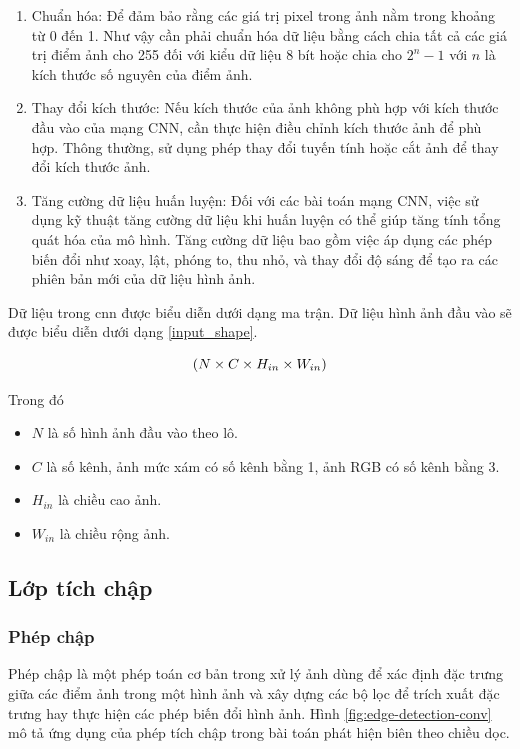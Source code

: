 \begin{enumerate}
	\item Chuẩn hóa: Để đảm bảo rằng các giá trị pixel trong ảnh nằm trong khoảng từ 0 đến 1. Như vậy cần phải chuẩn hóa dữ liệu bằng cách chia tất cả các giá trị điểm ảnh cho 255 đối với kiểu dữ liệu 8 bít hoặc chia cho $2^n-1$ với $n$ là kích thước số nguyên của điểm ảnh.
	\item Thay đổi kích thước: Nếu kích thước của ảnh không phù hợp với kích thước đầu vào của mạng CNN, cần thực hiện điều chỉnh kích thước ảnh để phù hợp. Thông thường, sử dụng phép thay đổi tuyến tính hoặc cắt ảnh để thay đổi kích thước ảnh.
	\item Tăng cường dữ liệu huấn luyện: Đối với các bài toán mạng CNN, việc sử dụng kỹ thuật tăng cường dữ liệu khi huấn luyện có thể giúp tăng tính tổng quát hóa của mô hình. Tăng cường dữ liệu bao gồm việc áp dụng các phép biến đổi như xoay, lật, phóng to, thu nhỏ, và thay đổi độ sáng để tạo ra các phiên bản mới của dữ liệu hình ảnh.
\end{enumerate}

Dữ liệu trong cnn được biểu diễn dưới dạng ma trận. Dữ liệu hình ảnh đầu vào sẽ được biểu diễn dưới dạng \ref{input_shape}.

\begin{equation}
	\centering
	\label{input_shape}
	(N \times C \times H_{in} \times W_{in})
\end{equation}

Trong đó
\begin{itemize}
	\item $N$ là số hình ảnh đầu vào theo lô.
	\item $C$ là số kênh, ảnh mức xám có số kênh bằng 1, ảnh RGB có số kênh bằng 3.
	\item $H_{in}$ là chiều cao ảnh.
	\item $W_{in}$ là chiều rộng ảnh.
\end{itemize}

\subsection{Lớp tích chập}

\subsubsection{Phép chập}

Phép chập là một phép toán cơ bản trong xử lý ảnh dùng để xác định đặc trưng giữa các điểm ảnh trong một hình ảnh và xây dựng các bộ lọc để trích xuất đặc trưng hay thực hiện các phép biến đổi hình ảnh. Hình \ref{fig:edge-detection-conv} mô tả ứng dụng của phép tích chập trong bài toán phát hiện biên theo chiều dọc.

